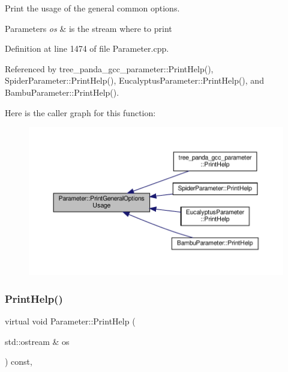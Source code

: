Print the usage of the general common options. 


\begin{DoxyParams}{Parameters}
{\em os} & is the stream where to print \\
\hline
\end{DoxyParams}


Definition at line 1474 of file Parameter.\+cpp.



Referenced by tree\+\_\+panda\+\_\+gcc\+\_\+parameter\+::\+Print\+Help(), Spider\+Parameter\+::\+Print\+Help(), Eucalyptus\+Parameter\+::\+Print\+Help(), and Bambu\+Parameter\+::\+Print\+Help().

Here is the caller graph for this function\+:
\nopagebreak
\begin{figure}[H]
\begin{center}
\leavevmode
\includegraphics[width=350pt]{dc/dab/classParameter_a5946b2b87c96920a76dfb47ac03300e9_icgraph}
\end{center}
\end{figure}
\mbox{\label{classParameter_a804e04bcbc2eca07deed52e112fa3321}} 
\subsubsection{\texorpdfstring{Print\+Help()}{PrintHelp()}}
{\footnotesize\ttfamily virtual void Parameter\+::\+Print\+Help (\begin{DoxyParamCaption}\item[{std\+::ostream \&}]{os }\end{DoxyParamCaption}) const\hspace{0.3cm}{\ttfamily [protected]}, {}}



